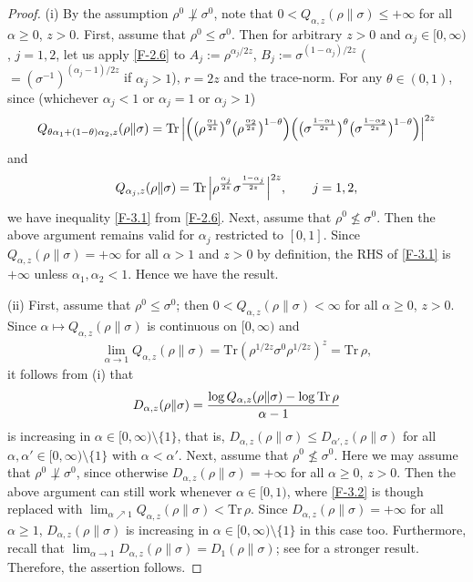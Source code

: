 \documentclass[11pt,reqno]{article}
\numberwithin{equation}{section}
\def\Tr{\mathrm{Tr}}
\begin{document}
\begin{proof}
(i)\enspace
By the assumption $\rho^0\not\perp\sigma^0$, note that $0<Q_{\alpha,z}(\rho\|\sigma)\le+\infty$ for all
$\alpha\ge0$, $z>0$. First, assume that $\rho^0\le\sigma^0$. Then for arbitrary $z>0$ and
$\alpha_j\in[0,\infty)$, $j=1,2$, let us apply \eqref{F-2.6} to $A_j:=\rho^{\alpha_j/2z}$,
$B_j:=\sigma^{(1-\alpha_j)/2z}$ ($=(\sigma^{-1})^{(\alpha_j-1)/2z}$ if $\alpha_j>1$), $r=2z$ and the trace-norm.
For any $\theta\in(0,1)$, since (whichever $\alpha_j<1$ or $\alpha_j=1$ or $\alpha_j>1$)
\[
Q_{\theta\alpha_1+(1-\theta)\alpha_2,z}(\rho\|\sigma)
=\Tr\,\Big|\Bigl(\bigl(\rho^{\alpha_1\over2z}\bigr)^\theta
\bigl(\rho^{\alpha_2\over2z}\bigr)^{1-\theta}\Bigr)
\Bigl(\bigl(\sigma^{1-\alpha_1\over2z}\bigr)^\theta
\bigl(\sigma^{1-\alpha_2\over2z}\bigr)^{1-\theta}\Bigr)\Big|^{2z}
\]
and
\[
Q_{\alpha_j,z}(\rho\|\sigma)
=\Tr\,\Big|\rho^{\alpha_j\over2z}\sigma^{1-\alpha_j\over2z}\Big|^{2z},\qquad j=1,2,
\]
we have inequality \eqref{F-3.1} from \eqref{F-2.6}. Next, assume that $\rho^0\not\le\sigma^0$. Then the
above argument remains valid for $\alpha_j$ restricted to $[0,1]$. Since $Q_{\alpha,z}(\rho\|\sigma)=+\infty$
for all $\alpha>1$ and $z>0$ by definition, the RHS of \eqref{F-3.1} is $+\infty$ unless $\alpha_1,\alpha_2<1$.
Hence we have the result.

(ii)\enspace
First, assume that $\rho^0\le\sigma^0$; then $0<Q_{\alpha,z}(\rho\|\sigma)<\infty$ for all $\alpha\ge0$, $z>0$.
Since $\alpha\mapsto Q_{\alpha,z}(\rho\|\sigma)$ is continuous on $[0,\infty)$ and
\begin{align}\label{F-3.2}
\lim_{\alpha\to1}Q_{\alpha,z}(\rho\|\sigma)=\Tr(\rho^{1/2z}\sigma^0\rho^{1/2z})^z=\Tr\,\rho,
\end{align}
it follows from (i) that
\[
D_{\alpha,z}(\rho\|\sigma)={\log Q_{\alpha,z}(\rho\|\sigma)-\log\Tr\,\rho\over\alpha-1}
\]
is increasing in $\alpha\in[0,\infty)\setminus\{1\}$, that is, $D_{\alpha,z}(\rho\|\sigma)\le D_{\alpha',z}(\rho\|\sigma)$
for all $\alpha,\alpha'\in[0,\infty)\setminus\{1\}$ with $\alpha<\alpha'$. Next, assume that $\rho^0\not\le\sigma^0$.
Here we may assume that $\rho^0\not\perp\sigma^0$, since otherwise $D_{\alpha,z}(\rho\|\sigma)=+\infty$ for all
$\alpha\ge0$, $z>0$. Then the above argument can still work whenever $\alpha\in[0,1)$, where \eqref{F-3.2}
is though replaced with $\lim_{\alpha\nearrow1}Q_{\alpha,z}(\rho\|\sigma)<\Tr\,\rho$. Since
$D_{\alpha,z}(\rho\|\sigma)=+\infty$ for all $\alpha\ge1$, $D_{\alpha,z}(\rho\|\sigma)$ is increasing in
$\alpha\in[0,\infty)\setminus\{1\}$ in this case too. Furthermore, recall that
$\lim_{\alpha\to1}D_{\alpha,z}(\rho\|\sigma)=D_1(\rho\|\sigma)$; see \cite[Proposition III.36]{MH2} for a
stronger result. Therefore, the assertion follows.
\end{proof}
\end{document}
